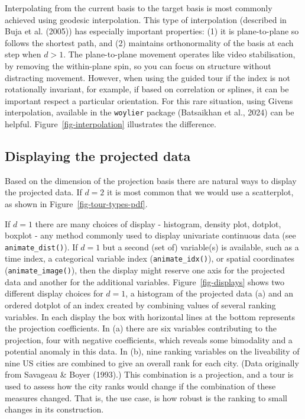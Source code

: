 \documentclass[
  letterpaper,
]{krantz}
\begin{document}
Interpolating from the current basis to the target basis is most
commonly achieved using geodesic interpolation. This type of
interpolation (described in Buja et al. (2005)) has especially important
properties: (1) it is plane-to-plane so follows the shortest path, and
(2) maintains orthonormality of the basis at each step when \(d>1\). The
plane-to-plane movement operates like video stabilisation, by removing
the within-plane spin, so you can focus on structure without distracting
movement. However, when using the guided tour if the index is not
rotationally invariant, for example, if based on correlation or splines,
it can be important respect a particular orientation. For this rare
situation, using Givens interpolation, available in the \texttt{woylier}
package (Batsaikhan et al., 2024) can be helpful.
Figure~\ref{fig-interpolation} illustrates the difference.

\subsection{Displaying the projected
data}\label{displaying-the-projected-data}

Based on the dimension of the projection basis there are natural ways to
display the projected data. If \(d=2\) it is most common that we would
use a scatterplot, as shown in Figure~\ref{fig-tour-types-pdf}.

If \(d=1\) there are many choices of display - histogram, density plot,
dotplot, boxplot - any method commonly used to display univariate
continuous data (see \texttt{animate\_dist()}). If \(d=1\) but a second
(set of) variable(s) is available, such as a time index, a categorical
variable index (\texttt{animate\_idx()}), or spatial coordinates
(\texttt{animate\_image()}), then the display might reserve one axis for
the projected data and another for the additional variables.
Figure~\ref{fig-displays} shows two different display choices for
\(d=1\), a histogram of the projected data (a) and an ordered dotplot of
an index created by combining values of several ranking variables. In
each display the box with horizontal lines at the bottom represents the
projection coefficients. In (a) there are six variables contributing to
the projection, four with negative coefficients, which reveals some
bimodality and a potential anomaly in this data. In (b), nine ranking
variables on the liveability of nine US cities are combined to give an
overall rank for each city. (Data originally from Savageau \& Boyer
(1993).) This combination is a projection, and a tour is used to assess
how the city ranks would change if the combination of these measures
changed. That is, the use case, is how robust is the ranking to small
changes in its construction.
\end{document}
